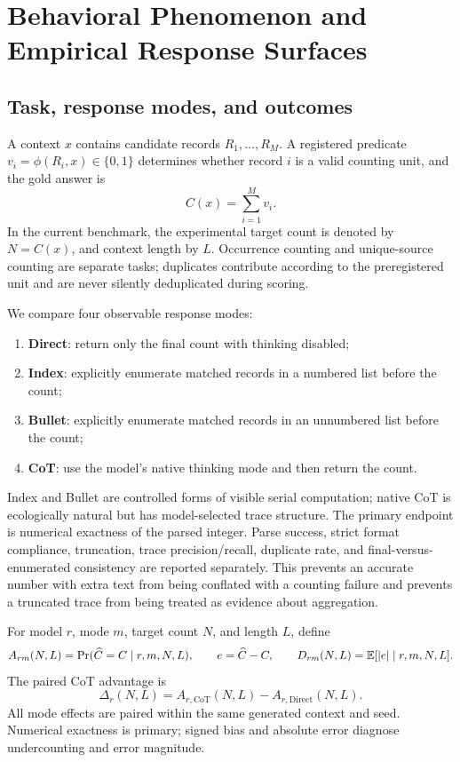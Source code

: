 \section{Behavioral Phenomenon and Empirical Response Surfaces}
\label{sec:behavior}

\subsection{Task, response modes, and outcomes}

A context \(x\) contains candidate records \(R_1,\ldots,R_M\). A registered predicate \(v_i=\phi(R_i,x)\in\{0,1\}\) determines whether record \(i\) is a valid counting unit, and the gold answer is
\begin{equation}
C(x)=\sum_{i=1}^{M}v_i.
\label{eq:count-task}
\end{equation}
In the current benchmark, the experimental target count is denoted by \(N=C(x)\), and context length by \(L\). Occurrence counting and unique-source counting are separate tasks; duplicates contribute according to the preregistered unit and are never silently deduplicated during scoring.

We compare four observable response modes:
\begin{enumerate}
  \item \textbf{Direct}: return only the final count with thinking disabled;
  \item \textbf{Index}: explicitly enumerate matched records in a numbered list before the count;
  \item \textbf{Bullet}: explicitly enumerate matched records in an unnumbered list before the count;
  \item \textbf{CoT}: use the model's native thinking mode and then return the count.
\end{enumerate}
Index and Bullet are controlled forms of visible serial computation; native CoT is ecologically natural but has model-selected trace structure. The primary endpoint is numerical exactness of the parsed integer. Parse success, strict format compliance, truncation, trace precision/recall, duplicate rate, and final-versus-enumerated consistency are reported separately. This prevents an accurate number with extra text from being conflated with a counting failure and prevents a truncated trace from being treated as evidence about aggregation.

For model \(r\), mode \(m\), target count \(N\), and length \(L\), define
\begin{equation}
A_{rm}(N,L)=
\Pr(\widehat C=C\mid r,m,N,L),
\qquad
e=\widehat C-C,
\qquad
D_{rm}(N,L)=\mathbb{E}[|e|\mid r,m,N,L].
\label{eq:behavior-estimands}
\end{equation}
The paired CoT advantage is
\begin{equation}
\Delta_r(N,L)=A_{r,\mathrm{CoT}}(N,L)-A_{r,\mathrm{Direct}}(N,L).
\label{eq:cot-gap}
\end{equation}
All mode effects are paired within the same generated context and seed. Numerical exactness is primary; signed bias and absolute error diagnose undercounting and error magnitude.

